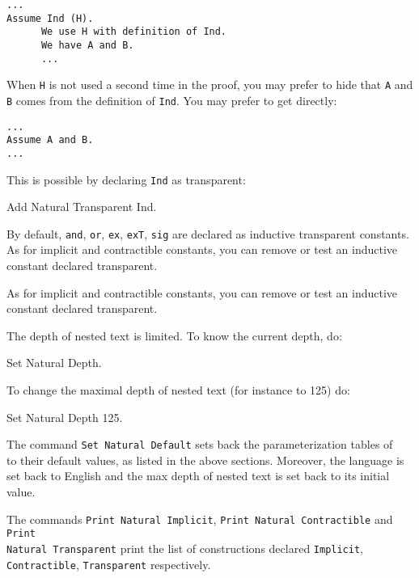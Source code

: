 \begin{verbatim}
...
Assume Ind (H).
      We use H with definition of Ind.
      We have A and B.
      ...
\end{verbatim}

When \verb=H= is not used a second time in the proof, you may prefer
to hide that \verb=A= and \verb=B= comes from the definition of
\verb=Ind=. You may prefer to get directly:

\begin{verbatim}
...
Assume A and B.
...
\end{verbatim}

This is possible by declaring \verb=Ind= as transparent:

\begin{coq_example*}
Add Natural Transparent Ind.
\end{coq_example*}

By default, \verb=and=, \verb=or=, \verb=ex=, \verb=exT=, \verb=sig=
are declared as inductive transparent constants.  As for implicit and
contractible constants, you can remove or test an inductive
constant declared transparent.

As for implicit and contractible constants, you can remove or test an
inductive constant declared transparent.


The depth of nested text is limited. To know the current depth, do:

\begin{coq_example}
Set Natural Depth.
\end{coq_example}

To change the maximal depth of nested text (for instance to 125) do:

\begin{coq_example}
Set Natural Depth 125.
\end{coq_example}


The command \verb=Set Natural Default= sets back the parameterization tables of
\Natural~ to their default values, as listed in the above sections.
Moreover, the language is set back to English and the max depth of
nested text is set back to its initial value.


The commands {\tt Print Natural Implicit}, {\tt Print Natural
Contractible} and {\tt Print \\ Natural Transparent} print the list of
constructions declared {\tt Implicit}, {\tt Contractible},
{\tt Transparent} respectively.

